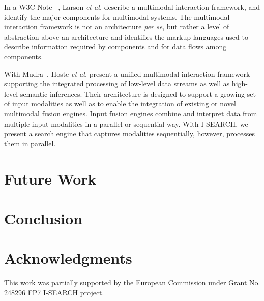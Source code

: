 \documentclass{acm_proc_article-sp}
\newcommand{\inlinelistingsize}{\fontsize{8pt}{11pt}}
\let\oldttdefault\ttdefault
\renewcommand{\ttdefault}{pcr}
\let\oldurl\url
\renewcommand{\url}[1]{\inlinelistingsize\oldurl{#1}}
\begin{document}
In a W3C Note~\cite{w3cmultimodal2003} , Larson \textit{et al.} describe a multimodal interaction framework, and identify the major components for multimodal systems.
The multimodal interaction framework is not an architecture \textit{per se}, but rather a level of abstraction above an architecture and identifies the markup languages used to describe information required by components and for data flows among components.

With Mudra~\cite{mudra2011}, Hoste \textit{et al.} present a unified multimodal interaction framework supporting the integrated processing of low-level data streams as well as high-level semantic inferences.
Their architecture is designed to support a growing set of input modalities as well as to enable the integration of existing or novel multimodal fusion engines.
Input fusion engines combine and interpret data from multiple input modalities in a parallel or sequential way.
With \mbox{I-SEARCH}, we present a search engine that captures modalities sequentially, however, processes them in parallel.

\section{Future Work} \label{sec:futurework}


\section{Conclusion} \label{sec:conclusion}


\section{Acknowledgments}
This work was partially supported by the European Commission under Grant No. 248296 FP7 \mbox{I-SEARCH} project.

\let\ttdefault\oldttdefault
\let\url\oldurl




\balancecolumns
\end{document}
